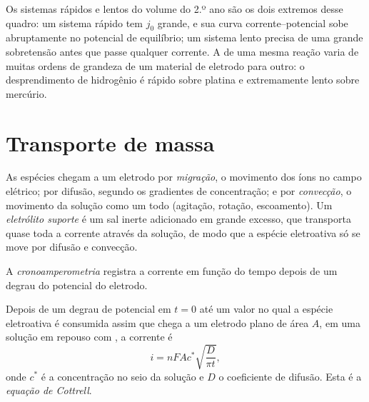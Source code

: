 Os sistemas rápidos e lentos do volume do 2.º ano são os dois extremos desse
quadro: um sistema rápido tem $j_0$ grande, e sua curva corrente--potencial sobe
abruptamente no potencial de equilíbrio; um sistema lento precisa de uma grande
sobretensão antes que passe qualquer corrente. A 
de uma mesma reação varia de muitas ordens de grandeza de um material de
eletrodo para outro: o desprendimento de hidrogênio é rápido sobre platina e
extremamente lento sobre mercúrio.

\section{Transporte de massa}

\begin{definition}\label{def:b3:electrode-kinetics:transport}
As espécies chegam a um eletrodo por \emph{migração}, o movimento
dos íons no campo elétrico; por difusão, segundo os gradientes de concentração; e por
\emph{convecção}, o movimento da solução como um todo
(agitação, rotação, escoamento). Um \emph{eletrólito suporte}
é um sal inerte adicionado em grande excesso, que transporta quase toda a
corrente através da solução, de modo que a espécie eletroativa só se move por
difusão e convecção.
\end{definition}

\begin{definition}[Cronoamperometria]\label{def:b3:electrode-kinetics:chronoamperometry}
A \emph{cronoamperometria} registra a corrente em função do
tempo depois de um degrau do potencial do eletrodo.
\end{definition}

\begin{theorem}\label{thm:b3:electrode-kinetics:cottrell}
Depois de um degrau de potencial em $t = 0$ até um valor no qual a espécie eletroativa é
consumida assim que chega a um eletrodo plano de área $A$, em uma solução em
repouso com , a corrente é
\[
  i = nFAc^*\sqrt{\frac{D}{\pi t}},
\]
onde $c^*$ é a concentração no seio da solução e $D$ o coeficiente de difusão. Esta é
a \emph{equação de Cottrell}.
\end{theorem}


